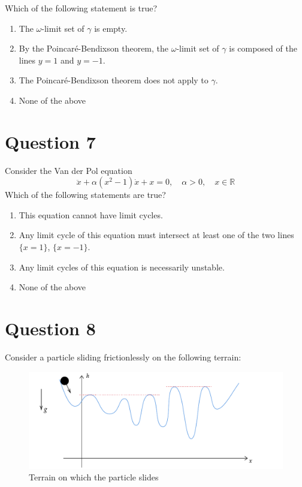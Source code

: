 \documentclass[twoside,10pt,a4paper]{article}
\begin{document}
Which of the following statement is true?

\begin{enumerate}[label=(\alph*)]
	\item The $\omega$-limit set of $\gamma$ is empty.
	\item By the Poincaré-Bendixson theorem, the $\omega$-limit set of $\gamma$ is composed of the lines $y = 1$ and $y = -1$.
	\item The Poincaré-Bendixson theorem does not apply to $\gamma$.
	\item None of the above
\end{enumerate}

\section*{Question 7}
Consider the Van der Pol equation
\begin{equation*}
	\ddot{x} + \alpha(x^2 - 1)\dot{x} + x = 0, \quad \alpha > 0, \quad x \in \mathbb{R}
\end{equation*}
Which of the following statements are true?

\begin{enumerate}[label=(\alph*)]
	\item This equation cannot have limit cycles.
	\item Any limit cycle of this equation must intersect at least one of the two lines $\{ x = 1 \}$, $\{ x = -1 \}$.
	\item Any limit cycles of this equation is necessarily unstable.
	\item None of the above
\end{enumerate}

\section*{Question 8}
Consider a particle sliding frictionlessly on the following terrain:

\begin{figure}[H]
	\centering
	\includegraphics[scale=0.9]{Graphics/MCQ2_figures/Q09D01.pdf}
	\caption{Terrain on which the particle slides}
\end{figure}
\end{document}
